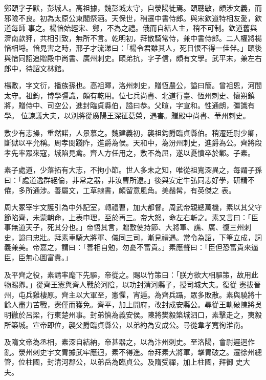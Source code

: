 \begin{pinyinscope}
 鄭頤字子默，彭城人。高祖據，魏彭城太守，自滎陽徙焉。頤聰敏，頗涉文義，而邪險不良。初為太原公東閣祭酒。天保世，稍遷中書侍郎。與宋欽道特相友愛，欽道每師
 事之。楊愔始輕宋、鄭，不為之禮。俄而自結人主，稍不可制。欽道舊與濟南款狎，共相引致，無所不言。乾明初，拜散騎常侍，兼中書侍郎。二人權將楊愔相埒。愔見害之時，邢子才流涕曰：「楊令君雖其人，死日恨不得一佳伴。」頤後與愔同詔追贈殿中尚書、廣州刺史。頤弟抗，字子信，頗有文學。武平末，兼左右郎中，待詔文林館。



 楊敷，字文衍，播族孫也。高祖暉，洛州刺史，贈恆農公，謚曰簡。曾祖恩，河間太守。祖鈞，博學彊識，頗有乾用。位七兵尚書、北道行臺、恆州刺史、懷朔鎮將，贈侍中、司空公，進封臨貞縣伯，謚曰恭。父暄，字宣和。性通朗，彊識有學。
 位諫議大夫，以別將從廣陽王深征葛榮，遇害。贈殿中尚書、華州刺史。



 敷少有志操，重然諾，人景慕之。魏建義初，襲祖鈞爵臨貞縣伯。稍遷廷尉少卿，斷獄以平允稱。周孝閔踐阼，進爵為侯。天和中，為汾州刺史，進爵為公。齊將段孝先率眾來寇，城陷見禽。齊人方任用之，敷不為屈，遂以憂憤卒於鄴。子素。



 素子處道，少落拓有大志，不拘小節。世人多未之知，唯從祖寬深異之，每謂子孫曰：「處道逸群絕倫，非常之器，非汝曹所逮。」後與安定牛弘同志好學，研精不倦，多所通涉。善屬文，工草隸書，頗留意風角。美鬚髯，有英傑之
 表。



 周大冢宰宇文護引為中外記室，轉禮曹，加大都督。周武帝親總萬機，素以其父守節陷齊，未蒙朝命，上表申理，至於再三。帝大怒，命左右斬之。素又言曰：「臣事無道天子，死其分也。」帝悟其言，贈敷使持節、大將軍、譙、廣、復三州刺史，謚曰忠壯。拜素車騎大將軍、儀同三司，漸見禮遇。常令為詔，下筆立成，詞義兼美。帝嘉之，謂曰：「善相自勉，勿憂不富貴。」素應聲曰：「臣但恐富貴來逼臣，臣無心圖富貴。」



 及平齊之役，素請率麾下先驅，帝從之。賜以竹策曰：「朕方欲大相驅策，故用此物賜卿。」從齊王憲與齊人戰於河陰，以功封清河縣子，授司城大夫。復從
 憲拔晉州，屯兵雞棲原。齊主以大軍至，憲懼，宵遁。為齊兵躡，眾多敗散。素與驍將十餘人盡力苦戰，憲僅而獲免。齊平，加上開府，改封成安縣公。尋從王軌破陳將吳明徹於呂梁，行東楚州事。封弟慎為義安侯。陳將樊毅築城泗口，素擊走之，夷毅所築城。宣帝即位，襲父爵臨貞縣公，以弟約為安成公。尋從韋孝寬徇淮南。



 及隋文帝為丞相，素深自結納，帝甚器之，以為汴州刺史。至洛陽，會尉遲迥作亂。滎州刺史宇文胄據武牢應迥，素不得進。帝拜素大將軍，擊胄破之。遷徐州總管，位柱國，封清河郡公，以弟岳為臨貞公。及隋受禪，加上柱國，拜御
 史大夫。




\end{pinyinscope}
